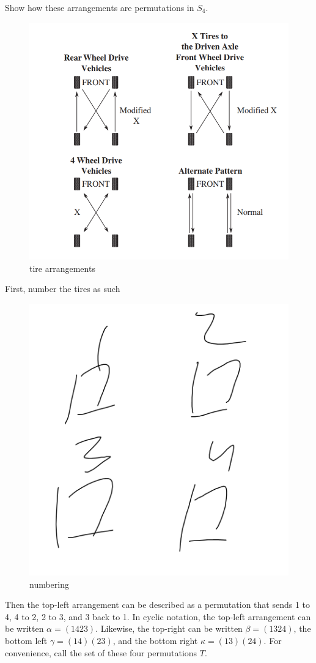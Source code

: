 \documentclass{article}
\begin{document}
Show how these arrangements are permutations in $S_4$.
\begin{figure}[htbp]
\centerline{\includegraphics[scale=0.5]{tires1.png}}
\caption{tire arrangements}
\label{fig}
\end{figure}
First, number the tires as such
\begin{figure}[htbp]
\centerline{\includegraphics[scale=0.1]{tires.png}}
\caption{numbering}
\label{fig}
\end{figure}
Then the top-left arrangement can be described as a permutation that sends 1 to 4, 4 to 2, 2 to 3, and 3 back to 1. In cyclic notation, the top-left arrangement can be written $\alpha = (1423)$. Likewise, the top-right can be written $\beta = (1324)$, the bottom left $\gamma = (14)(23)$, and the bottom right $\kappa = (13)(24)$. For convenience, call the set of these four permutations $T$. \\
\end{document}
